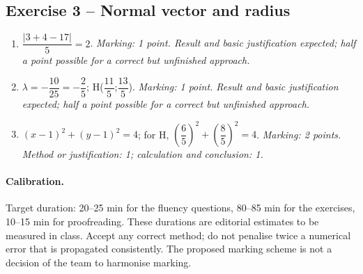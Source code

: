 \subsection*{Exercise 3 -- Normal vector and radius}
\begin{enumerate}
\item $\dfrac{|3+4-17|}{5}=2$. \textit{Marking: 1 point. Result and basic justification expected; half a point possible for a correct but unfinished approach.}
\item $\lambda =-\dfrac{10}{25}=-\dfrac{2}{5}$; H($\dfrac{11}{5}$;$\dfrac{13}{5}$). \textit{Marking: 1 point. Result and basic justification expected; half a point possible for a correct but unfinished approach.}
\item $(x-1)^2+(y-1)^2=4$; for H, $(\dfrac{6}{5})^2+(\dfrac{8}{5})^2=4$. \textit{Marking: 2 points. Method or justification: 1; calculation and conclusion: 1.}
\end{enumerate}
\paragraph{Calibration.} Target duration: 20--25 min for the fluency questions, 80--85 min for the exercises, 10--15 min for proofreading. These durations are editorial estimates to be measured in class. Accept any correct method; do not penalise twice a numerical error that is propagated consistently. The proposed marking scheme is not a decision of the team to harmonise marking.
